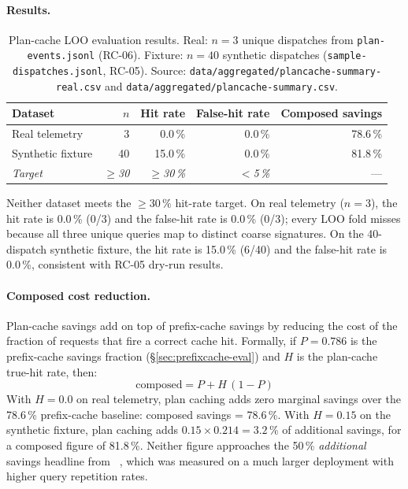 \paragraph{Results.}
\begin{table}[h]
\centering
\caption{Plan-cache LOO evaluation results.
  Real: \(n=3\) unique dispatches from \texttt{plan-events.jsonl} (RC-06).
  Fixture: \(n=40\) synthetic dispatches (\texttt{sample-dispatches.jsonl}, RC-05).
  Source: \texttt{data/aggregated/plancache-summary-real.csv} and
  \texttt{data/aggregated/plancache-summary.csv}.}
\label{tab:plancache-results}
\begin{tabular}{lrrrr}
\toprule
Dataset & $n$ & Hit rate & False-hit rate & Composed savings \\
\midrule
Real telemetry & 3  & 0.0\,\% & 0.0\,\% & 78.6\,\% \\
Synthetic fixture & 40 & 15.0\,\% & 0.0\,\% & 81.8\,\% \\
\textit{Target} & \textit{$\geq$30} & \textit{$\geq$30\,\%} & \textit{$<$5\,\%} & — \\
\bottomrule
\end{tabular}
\end{table}

Neither dataset meets the \(\geq\!30\,\%\) hit-rate target.
On real telemetry (\(n=3\)), the hit rate is 0.0\,\% (0/3) and the
false-hit rate is 0.0\,\% (0/3); every LOO fold misses because all three
unique queries map to distinct coarse signatures.
On the 40-dispatch synthetic fixture, the hit rate is 15.0\,\% (6/40) and
the false-hit rate is 0.0\,\%, consistent with RC-05 dry-run results.

\paragraph{Composed cost reduction.}
Plan-cache savings add on top of prefix-cache savings by reducing the cost
of the fraction of requests that fire a correct cache hit.
Formally, if \(P = 0.786\) is the prefix-cache savings fraction (§\ref{sec:prefixcache-eval})
and \(H\) is the plan-cache true-hit rate, then:
\[
  \text{composed} = P + H\,(1 - P)
\]
With \(H=0.0\) on real telemetry, plan caching adds zero marginal savings
over the 78.6\,\% prefix-cache baseline: composed savings = 78.6\,\%.
With \(H=0.15\) on the synthetic fixture, plan caching adds
\(0.15 \times 0.214 = 3.2\,\%\) of additional savings, for a composed
figure of 81.8\,\%.
Neither figure approaches the 50\,\% \emph{additional} savings headline
from \citeauthor{plancache}~\cite{plancache}, which was measured on a much
larger deployment with higher query repetition rates.

